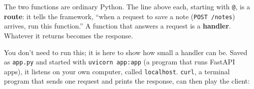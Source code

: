 \begin{codebox}[short]

\begin{Shaded}
\begin{Highlighting}[]

\OperatorTok{=}
\OperatorTok{=}\NormalTok{ []  }

\NormalTok{(}\NormalTok{)}
\NormalTok{):}
\NormalTok{    notes.append(note[}\NormalTok{])}
    \NormalTok{ \{}\NormalTok{: }\NormalTok{, }\NormalTok{: }

\NormalTok{(}\NormalTok{)}
    \NormalTok{ \{}
\end{Highlighting}
\end{Shaded}

\end{codebox}

\noindent{}The two functions are ordinary Python. The line above each, starting with \texttt{@}, is a \textbf{route}: it tells the framework, ``when a request to save a note (\texttt{POST\ /notes}) arrives, run this function.'' A function that answers a request is a \textbf{handler}. Whatever it returns becomes the response.

You don't need to run this; it is here to show how small a handler can be. Saved as \texttt{app.py} and started with \texttt{uvicorn\ app:app} (a program that runs FastAPI apps), it listens on your own computer, called \texttt{localhost}. \texttt{curl}, a terminal program that sends one request and prints the response, can then play the client:

\begin{codebox}[short]

\begin{Shaded}
\begin{Highlighting}[]
 \DataTypeTok{\textbackslash{}}
    \DataTypeTok{\textbackslash{}}
   
\end{Highlighting}
\end{Shaded}

\end{codebox}

